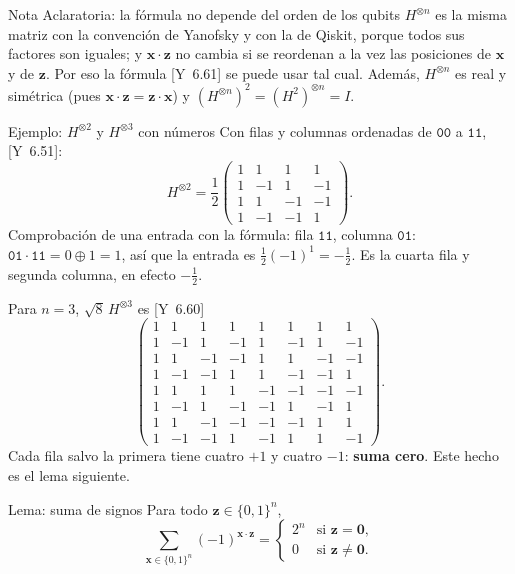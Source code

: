 \documentclass[11pt, a4paper, twoside, openright]{report}
\newcommand{\bx}{\mathbf{x}}
\newcommand{\bz}{\mathbf{z}}
\newcommand{\bcero}{\mathbf{0}}
\newcommand{\bits}[1]{\{0,1\}^{#1}}
\newcommand{\Yan}[1]{\textcolor{rosaviejo}{\small[Y~#1]}}  %
\begin{document}
\begin{aclaracion}{Nota Aclaratoria: la fórmula no depende del orden de los qubits}
$H^{\otimes n}$ es la misma matriz con la convención de Yanofsky y con la de Qiskit, porque todos sus factores son iguales; y $\bx\cdot\bz$ no cambia si se reordenan a la vez las posiciones de $\bx$ y de $\bz$. Por eso la fórmula \Yan{6.61} se puede usar tal cual. Además, $H^{\otimes n}$ es real y simétrica (pues $\bx\cdot\bz = \bz\cdot\bx$) y $(H^{\otimes n})^2 = (H^2)^{\otimes n} = I$.
\end{aclaracion}

\begin{ejemplo}{Ejemplo: $H^{\otimes2}$ y $H^{\otimes3}$ con números}
Con filas y columnas ordenadas de $\texttt{00}$ a $\texttt{11}$, \Yan{6.51}:
\[ H^{\otimes2} = \frac12\begin{pmatrix} 1&1&1&1\\1&-1&1&-1\\1&1&-1&-1\\1&-1&-1&1 \end{pmatrix}. \]
Comprobación de una entrada con la fórmula: fila $\texttt{11}$, columna $\texttt{01}$: $\texttt{01}\cdot\texttt{11} = 0\oplus1 = 1$, así que la entrada es $\frac12(-1)^1 = -\frac12$. Es la cuarta fila y segunda columna, en efecto $-\frac12$.

Para $n = 3$, $\sqrt8\,H^{\otimes3}$ es \Yan{6.60}
\[
\begin{pmatrix}
1&1&1&1&1&1&1&1\\ 1&-1&1&-1&1&-1&1&-1\\ 1&1&-1&-1&1&1&-1&-1\\ 1&-1&-1&1&1&-1&-1&1\\
1&1&1&1&-1&-1&-1&-1\\ 1&-1&1&-1&-1&1&-1&1\\ 1&1&-1&-1&-1&-1&1&1\\ 1&-1&-1&1&-1&1&1&-1
\end{pmatrix}.
\]
Cada fila salvo la primera tiene cuatro $+1$ y cuatro $-1$: \textbf{suma cero}. Este hecho es el lema siguiente.
\end{ejemplo}

\begin{teoria}{Lema: suma de signos}
Para todo $\bz\in\bits{n}$,
\[ \sum_{\bx\in\bits{n}}(-1)^{\bx\cdot\bz} = \begin{cases} 2^n & \text{si } \bz = \bcero, \\ 0 & \text{si } \bz\neq\bcero. \end{cases} \]
\end{teoria}
\end{document}
